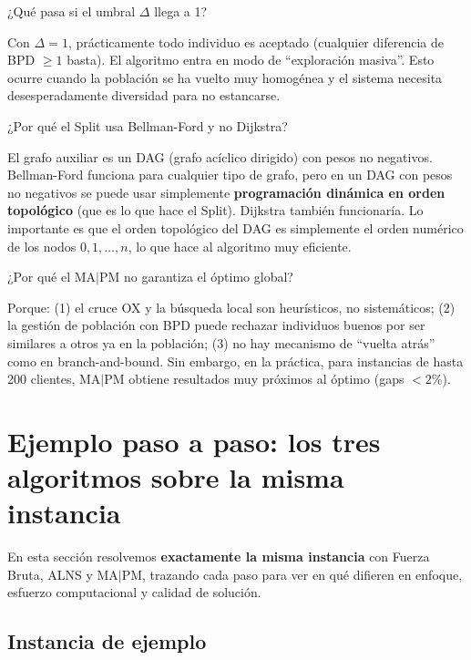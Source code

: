 \documentclass[12pt,a4paper]{article}
\begin{document}
\begin{pregunta}
¿Qué pasa si el umbral $\Delta$ llega a 1?
\end{pregunta}
Con $\Delta=1$, prácticamente todo individuo es aceptado (cualquier diferencia de BPD $\geq 1$ basta). El algoritmo entra en modo de ``exploración masiva''. Esto ocurre cuando la población se ha vuelto muy homogénea y el sistema necesita desesperadamente diversidad para no estancarse.

\begin{pregunta}
¿Por qué el Split usa Bellman-Ford y no Dijkstra?
\end{pregunta}
El grafo auxiliar es un DAG (grafo acíclico dirigido) con pesos no negativos. Bellman-Ford funciona para cualquier tipo de grafo, pero en un DAG con pesos no negativos se puede usar simplemente \textbf{programación dinámica en orden topológico} (que es lo que hace el Split). Dijkstra también funcionaría. Lo importante es que el orden topológico del DAG es simplemente el orden numérico de los nodos $0, 1, \ldots, n$, lo que hace al algoritmo muy eficiente.

\begin{pregunta}
¿Por qué el MA$|$PM no garantiza el óptimo global?
\end{pregunta}
Porque: (1) el cruce OX y la búsqueda local son heurísticos, no sistemáticos; (2) la gestión de población con BPD puede rechazar individuos buenos por ser similares a otros ya en la población; (3) no hay mecanismo de ``vuelta atrás'' como en branch-and-bound. Sin embargo, en la práctica, para instancias de hasta 200 clientes, MA$|$PM obtiene resultados muy próximos al óptimo (gaps $<2\%$).

\section{Ejemplo paso a paso: los tres algoritmos sobre la misma instancia}

En esta sección resolvemos \textbf{exactamente la misma instancia} con Fuerza Bruta, ALNS y MA$|$PM, trazando cada paso para ver en qué difieren en enfoque, esfuerzo computacional y calidad de solución.

\subsection*{Instancia de ejemplo}
\end{document}
